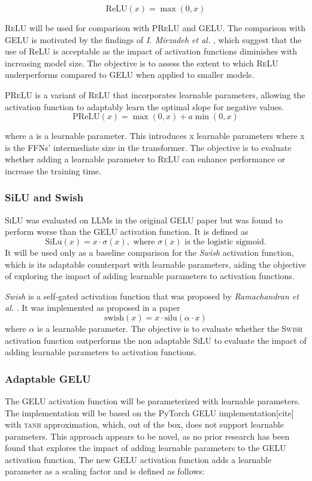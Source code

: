 \[
\text{ReLU}(x) = \max(0, x)
\]

\textsc{ReLU} will be used for comparison with \textsc{PReLU} and \textsc{GELU}. The comparison with \textsc{GELU} is motivated by the findings of \textit{I. Mirzadeh et al.} \cite{Mirzadeh2023}, which suggest that the use of ReLU is acceptable as the impact of activation functions diminishes with increasing model size. The objective is to assess the extent to which \textsc{ReLU} underperforms compared to \textsc{GELU} when applied to smaller models.

\textsc{PReLU} is a variant of \textsc{ReLU} that incorporates learnable parameters, allowing the activation function to adaptably learn the optimal slope for negative values.
\[
\text{PReLU}(x) = \max(0, x) + a \min(0, x)
\]

where a is a learnable parameter. This introduces x learnable parameters where x is the FFNs’ intermediate size in the transformer. The objective is to evaluate whether adding a learnable parameter to \textsc{ReLU} can enhance performance or increase the training time.

\subsubsection{SiLU and Swish}
\textsc{SiLU} was evaluated on LLMs in the original \textsc{GELU} paper \cite{Hendrycks2023} but was found to perform worse than the \textsc{GELU} activation function. It is defined as 
\[
\text{SiLu}(x) = x \cdot \sigma(x), \text{ where } \sigma(x) \text{ is the logistic sigmoid.}
\]
It will be used only as a baseline comparison for the \textit{Swish} activation function, which is its adaptable counterpart with learnable parameters, aiding the objective of exploring the impact of adding learnable parameters to activation functions. 

\textit{Swish} is a self-gated activation function that was proposed by \textit{Ramachandran et al.} \cite{Ramachandran2017}. It was implemented as proposed in a paper
\[
    \text{swish}(x) = x \cdot \text{silu}(\alpha \cdot x)
\]
where \(\alpha\) is a learnable parameter. The objective is to evaluate whether the \textsc{Swish} activation function outperforms the non adaptable \textsc{SiLU} to evaluate the impact of adding learnable parameters to activation functions.

\subsubsection{Adaptable GELU}
The GELU activation function will be parameterized with learnable parameters. The implementation will be based on the PyTorch GELU implementation[cite] with \textsc{tanh} approximation, which, out of the box, does not support learnable parameters. This approach appears to be novel, as no prior research has been found that explores the impact of adding learnable parameters to the \textsc{GELU} activation function. The new \textsc{GELU} activation function adds a learnable parameter as a scaling factor and is defined as follows:

